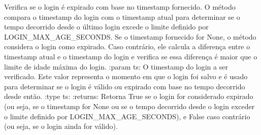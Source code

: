 \documentclass[letterpaper,10pt,english]{sphinxmanual}
\begin{document}

\begin{fulllineitems}
\label{\detokenize{api/user_login:user_login.is_login_expired}}
\pysigstartsignatures
\pysiglinewithargsret
{}
{}
{}
\pysigstopsignatures
\sphinxAtStartPar
Verifica se o login é expirado com base no timestamp fornecido. O método compara o timestamp do login com o timestamp atual para determinar se o tempo decorrido desde o último login excede o limite definido por LOGIN\_MAX\_AGE\_SECONDS. Se o timestamp fornecido for None, o método considera o login como expirado. Caso contrário, ele calcula a diferença entre o timestamp atual e o timestamp do login e verifica se essa diferença é maior que o limite de idade máxima do login.
:param ts: O timestamp do login a ser verificado. Este valor representa o momento em que o login foi salvo e é usado para determinar se o login é válido ou expirado com base no tempo decorrido desde então.
:type ts: 
:returns: Retorna True se o login for considerado expirado (ou seja, se o timestamp for None ou se o tempo decorrido desde o login exceder o limite definido por LOGIN\_MAX\_AGE\_SECONDS), e False caso contrário (ou seja, se o login ainda for válido).
\begin{quote}\begin{description}
\sphinxAtStartPar
{}

\end{description}\end{quote}

\end{fulllineitems}

\end{document}
